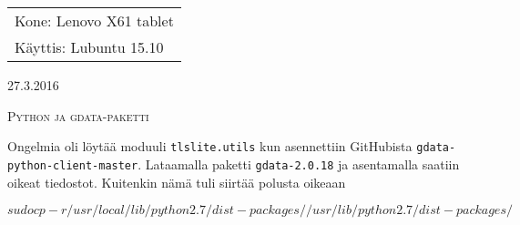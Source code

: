 \documentclass[main.tex]{subfiles}
\begin{document}
\thispagestyle{empty}
\begin{tabular}[t]{l}
Kone: Lenovo X61 tablet\\
Käyttis: Lubuntu 15.10
\end{tabular}
\hfill 27.3.2016

{\scshape\Large{Python ja gdata-paketti}}

Ongelmia oli löytää moduuli \texttt{tlslite.utils} kun asennettiin GitHubista \texttt{gdata-python-client-master}. Lataamalla paketti \texttt{gdata-2.0.18} ja asentamalla saatiin oikeat tiedostot. Kuitenkin nämä tuli siirtää polusta oikeaan

\[
  sudo cp -r /usr/local/lib/python2.7/dist-packages/ /usr/lib/python2.7/dist-packages/
\]
\end{document}
